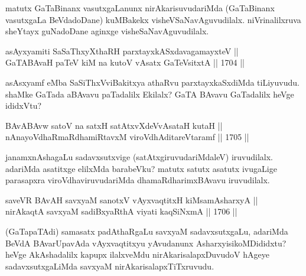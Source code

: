 \begin{artha}
matutx GaTaBinanx vasutxgaLanunx nirAkarisuvudariMda (GaTaBinanx vasutxgaLa BeVdadoDane) kuMBakekx visheVSaNavAguvudilalx. niVrinalilxruva sheYtayx guNadoDane aginxge visheSaNavAguvudilalx.
\end{artha}


\begin{shl}
\footnotemark[4]asAyxyamiti SaSaThxyXthaRH parxtayxkASxdavagamayxteV || \\
GaTABAvaH paTeV kiM na kutoV vA\s satx GaTeV\s sitxtA \hfill || 1704 ||  
\end{shl}

\begin{artha}
asAsxyamf eMba SaSiThxVviBakitxya athaRvu parxtayxkaSxdiMda tiLiyuvudu. shaMke GaTada aBAvavu paTadalilx Ekilalx? GaTA BAvavu GaTadalilx heVge ididxVtu?
\end{artha}


\begin{shl}
BAvABAvw satoV na satxH satAtxvXdeVvAsataH kutaH || \\
nAnayoVdhaRmaRdhamiRtavxM viroVdhAditareVtaramf \hfill || 1705 ||  
\end{shl}

\begin{artha}
janamxnAshagaLu sadavxsutxvige (satAtxgiruvudariMdaleV) iruvudilalx. adariMda asatitxge elilxMda barabeVku? matutx satutx asatutx ivugaLige parasapxra viroVdhaviruvudariMda dhamaRdharimxBAvavu iruvudilalx.
\end{artha}

\begin{shl}
saveVR BAvAH savxyaM sanotxV vAyxvaqtitxH kiMsamAsharxyA || \\
nirAkaqtA savxyaM sadiBxyaRthA viyati kaqSiNxmA \hfill || 1706 ||  
\end{shl}

\begin{artha}
(GaTapaTAdi) samasatx padAthaRgaLu savxyaM sadavxsutxgaLu, adariMda BeVdA BAvarUpavAda vAyxvaqtitxyu yAvudanunx AsharxyisikoMDididxtu? heVge AkAshadalilx kapupx ilalxveMdu nirAkarisalapxDuvudoV hAgeye sadavxsutxgaLiMda savxyaM nirAkarisalapxTiTxruvudu.
\end{artha}

